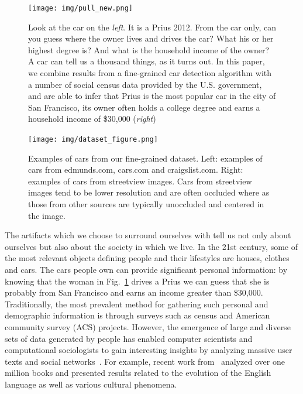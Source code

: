 \documentclass[10pt,twocolumn,letterpaper]{article}
\begin{document}
\begin{figure}[t]
\begin{center}
   \texttt{[image: img/pull\_new.png]}
\end{center}
   \caption{Look at the car on the {\em left}. It is a Prius 2012. From the car only, can you guess where the owner lives and drives the car? What his or her highest degree is? And what is the household income of the owner? A car can tell us a thousand things, as it turns out. In this paper, we combine results from a fine-grained car detection algorithm with a number of social census data provided by the U.S. government, and are able to infer that Prius is the most popular car in the city of San Francisco, its owner often holds a college degree and earns a household income of \$30,000 ({\em right})}
\label{fig:pull}
\end{figure}
\begin{figure}[t]
\begin{center}
   \texttt{[image: img/dataset\_figure.png]}
\end{center}
   \caption{Examples of cars from our fine-grained dataset. Left: examples of cars from edmunds.com, cars.com and craigslist.com. Right: examples of cars from streetview images. Cars from streetview images tend to be lower resolution and are often occluded where as those from other sources are typically unoccluded and centered in the image.}
\label{fig:dataset1}
\end{figure}
The artifacts which we choose to surround ourselves with tell us not only about ourselves but also about the society in which we live. In the 21st century, some of the most relevant objects defining people and their lifestyles are houses, clothes and cars. The cars people own can provide significant personal information: by knowing that the woman in Fig.~\ref{fig:pull} drives a Prius we can guess that she is probably from San Francisco and earns an income greater than \$30,000. Traditionally, the most prevalent method for gathering such personal and demographic information is through surveys such as census and American community survey (ACS) projects. However, the emergence of large and diverse sets of data generated by people has enabled computer scientists and computational sociologists to gain interesting insights by analyzing massive user texts and social networks~\cite{jure,nlp_people}. For example, recent work from~\cite{ngrams} analyzed over one million books and presented results related to the evolution of the English language as well as various cultural phenomena.
\end{document}
